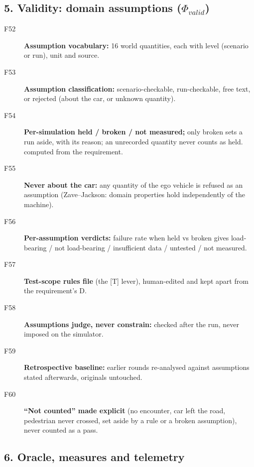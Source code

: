 \subsection*{5. Validity: domain assumptions ($\Phi_{valid}$)}

\begin{description}
\item[F52] \textbf{Assumption vocabulary:} 16 world quantities, each with level (scenario or run), unit and source. \tagnew{} 
\item[F53] \textbf{Assumption classification:} scenario-checkable, run-checkable, free text, or rejected (about the car, or unknown quantity). \tagnew{}
\item[F54] \textbf{Per-simulation held / broken / not measured;} only broken sets a run aside, with its reason; an unrecorded quantity never counts as held.  \tagnew{} computed from the requirement.
\item[F55] \textbf{Never about the car:} any quantity of the ego vehicle is refused as an assumption (Zave--Jackson: domain properties hold independently of the machine). \tagnew{}
\item[F56] \textbf{Per-assumption verdicts:} failure rate when held vs broken gives load-bearing / not load-bearing / insufficient data / untested / not measured. \tagnew{}
\item[F57] \textbf{Test-scope rules file} (the [T] lever), human-edited and kept apart from the requirement's D. \tagnew{}
\item[F58] \textbf{Assumptions judge, never constrain:} checked after the run, never imposed on the simulator. 
\item[F59] \textbf{Retrospective baseline:} earlier rounds re-analysed against assumptions stated afterwards, originals untouched. \tagnew{}
\item[F60] \textbf{``Not counted'' made explicit} (no encounter, car left the road, pedestrian never crossed, set aside by a rule or a broken assumption), never counted as a pass. \tagnew{}
\end{description}

\subsection*{6. Oracle, measures and telemetry}

